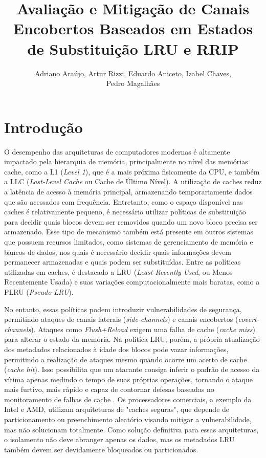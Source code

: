 \documentclass[12pt]{article}
\title{Avaliação e Mitigação de Canais Encobertos Baseados em Estados de Substituição LRU e RRIP}
\author{Adriano Araújo\inst{1}, Artur Rizzi\inst{1}, Eduardo Aniceto\inst{1}, Izabel Chaves\inst{1}\orcidlink{0009-0008-9198-3909},\\ Pedro Magalhães\inst{1}}
\begin{document}
 

\maketitle

\section{Introdução}

O desempenho das arquiteturas de computadores modernas é altamente impactado pela hierarquia de memória, principalmente no nível das memórias cache, como a L1 (\textit{Level 1}), que é a mais próxima fisicamente da CPU, e também a LLC (\textit{Last-Level Cache} ou Cache de Último Nível). A utilização de caches reduz a latência de acesso à memória principal, armazenando temporariamente dados que são acessados com frequência. Entretanto, como o espaço disponível nas caches é relativamente pequeno, é necessário utilizar políticas de substituição para decidir quais blocos devem ser removidos quando um novo bloco precisa ser armazenado. Esse tipo de mecanismo também está presente em outros sistemas que possuem recursos limitados, como sistemas de gerenciamento de memória e bancos de dados, nos quais é necessário decidir quais informações devem permanecer armazenadas e quais podem ser substituídas. Entre as políticas utilizadas em caches, é destacado a LRU (\textit{Least-Recently Used}, ou Menos Recentemente Usada) e suas variações computacionalmente mais baratas, como a PLRU (\textit{Pseudo-LRU}).

No entanto, essas políticas podem introduzir vulnerabilidades de segurança, permitindo ataques de canais laterais (\textit{side-channels}) e canais encobertos (\textit{covert-channels}). Ataques como \textit{Flush+Reload} exigem uma falha de cache (\textit{cache miss}) para alterar o estado da memória. Na política LRU, porém, a própria atualização dos metadados relacionados à idade dos blocos pode vazar informações, permitindo a realização de ataques mesmo quando ocorre um acerto de cache (\textit{cache hit}). Isso possibilita que um atacante consiga inferir o padrão de acesso da vítima apenas medindo o tempo de suas próprias operações, tornando o ataque mais furtivo, mais rápido e capaz de contornar defesas baseadas no monitoramento de falhas de cache \cite{9354935}. Os processadores comerciais, a exemplo da Intel e AMD, utilizam arquiteturas de "caches seguras", que depende de particionamento ou preenchimento aleatório visando mitigar a vulnerabilidade, mas não solucionam totalmente. Como solução definitiva para essas arquiteturas, o isolamento não deve abranger apenas os dados, mas os metadados LRU também devem ser devidamente bloqueados ou particionados.
\end{document}
